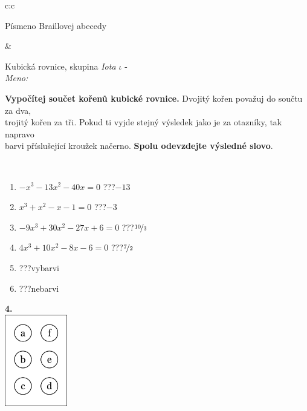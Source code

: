 \documentclass[10pt]{report}
\begin{document}
\begin{tabular}{c:c}
\begin{minipage}[c][104.5mm][t]{0.5\linewidth}
\begin{center}
\begin{minipage}{0.20\linewidth}
\begin{center}
{\small Písmeno Braillovej abecedy}
\end{center}
\end{minipage}
\end{center}
\end{minipage}
&
\begin{minipage}[c][104.5mm][t]{0.5\linewidth}
\begin{center}
\vspace{7mm}
{\huge Kubická rovnice, skupina \textit{Iota $\iota$} -}\\[5mm]
\textit{Meno:}\phantom{xxxxxxxxxxxxxxxxxxxxxxxxxxxxxxxxxxxxxxxxxxxxxxxxxxxxxxxxxxxxxxxxx}\\[5mm]
\begin{minipage}{0.95\linewidth}
\textbf{Vypočítej součet kořenů kubické rovnice.} Dvojitý kořen považuj do součtu za dva,\\trojitý kořen za tři. Pokud ti vyjde stejný výsledek jako je za otazníky, tak napravo\\barvi příslušející kroužek načerno. \textbf{Spolu odevzdejte výsledné slovo}.
\end{minipage}
\\[1mm]
\begin{minipage}{0.79\linewidth}
\begin{center}
\begin{varwidth}{\linewidth}
\begin{enumerate}
\Large
\item $-x^3-13x^2-40x=0$\quad \dotfill\; ???\;\dotfill \quad $-13$
\item $x^3+x^2-x-1=0$\quad \dotfill\; ???\;\dotfill \quad $-3$
\item $-9x^3+30x^2-27x+6=0$\quad \dotfill\; ???\;\dotfill \quad $\nicefrac{10}{3}$
\item $4x^3+10x^2-8x-6=0$\quad \dotfill\; ???\;\dotfill \quad $\nicefrac{7}{2}$
\item \quad \dotfill\; ???\;\dotfill \quad vybarvi
\item \quad \dotfill\; ???\;\dotfill \quad nebarvi
\end{enumerate}
\end{varwidth}
\end{center}
\end{minipage}
\begin{minipage}{0.20\linewidth}
\begin{center}
{\Huge\bfseries 4.} \\[2mm]
\includegraphics[height=40mm]{../images/braille.png}

\end{center}
\end{minipage}
\end{center}
\end{minipage}
\end{tabular}
\end{document}
